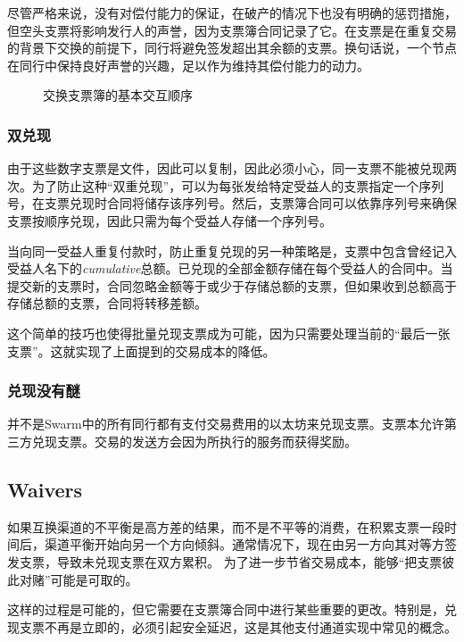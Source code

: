 尽管严格来说，没有对偿付能力的保证，在破产的情况下也没有明确的惩罚措施，但空头支票将影响发行人的声誉，因为支票簿合同记录了它。在支票是在重复交易的背景下交换的前提下，同行将避免签发超出其余额的支票。换句话说，一个节点在同行中保持良好声誉的兴趣，足以作为维持其偿付能力的动力。


\begin{figure}[htbp]
\centering

\caption[交换支票簿的基本交互序列\statusgreen]{交换支票簿的基本交互顺序}
\label{fig:swap-chequebook}
\end{figure}


\subsubsection{双兑现}

由于这些数字支票是文件，因此可以复制，因此必须小心，同一支票不能被兑现两次。为了防止这种“双重兑现”，可以为每张发给特定受益人的支票指定一个序列号，在支票兑现时合同将储存该序列号。然后，支票簿合同可以依靠序列号来确保支票按顺序兑现，因此只需为每个受益人存储一个序列号。

当向同一受益人重复付款时，防止重复兑现的另一种策略是，支票中包含曾经记入受益人名下的\emph{cumulative}总额。已兑现的全部金额存储在每个受益人的合同中。当提交新的支票时，合同忽略金额等于或少于存储总额的支票，但如果收到总额高于存储总额的支票，合同将转移差额。


这个简单的技巧也使得批量兑现支票成为可能，因为只需要处理当前的“最后一张支票”。这就实现了上面提到的交易成本的降低。

\subsubsection{兑现没有醚}\label{sec:zero_eth}
并不是Swarm中的所有同行都有支付交易费用的以太坊来兑现支票。支票本允许第三方兑现支票。交易的发送方会因为所执行的服务而获得奖励。

\subsection{Waivers\statusgreen}\label{sec:waiver}

如果互换渠道的不平衡是高方差的结果，而不是不平等的消费，在积累支票一段时间后，渠道平衡开始向另一个方向倾斜。通常情况下，现在由另一方向其对等方签发支票，导致未兑现支票在双方累积。
为了进一步节省交易成本，能够“把支票彼此对赌”可能是可取的。

这样的过程是可能的，但它需要在支票簿合同中进行某些重要的更改。特别是，兑现支票不再是立即的，必须引起安全延迟，这是其他支付通道实现中常见的概念。

